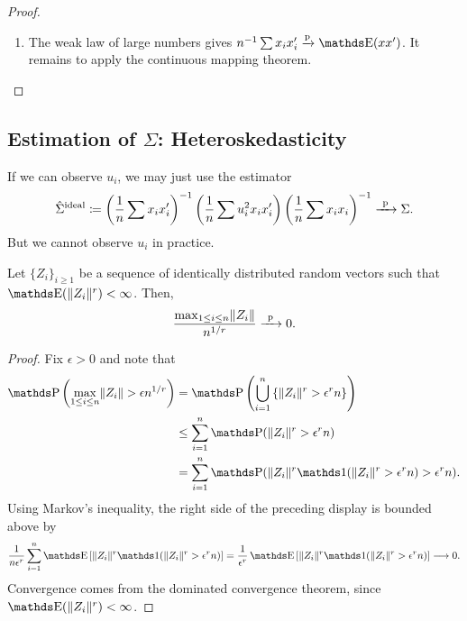 \documentclass[letterpaper, 10pt]{article}
\begin{document}
\begin{proof}
\begin{enumerate}[label=(\roman*)]
  \item %
    The weak law of large numbers gives \(n^{-1} \sum x_i x_i' \probto \E(xx')\).
    It remains to apply the continuous mapping theorem.
\end{enumerate}
\end{proof}



\subsection{Estimation of \texorpdfstring{\(\Sigma\)}{the Asymptotic Covariance Matrix}: Heteroskedasticity}
If we can observe \(u_i\), we may just use the estimator
\[
  \hat{\Sigma}^{\text{ideal}}
  \coloneqq \left( \frac{1}{n} \sum x_i x_i' \right)^{-1} \left( \frac{1}{n} \sum u_i^2 x_i x_i' \right) \left( \frac{1}{n} \sum x_i x_i \right)^{-1}
  \xrightarrow{\ \mathrm{p}\ } \Sigma.
\]
But we cannot observe \(u_i\) in practice.


\begin{lemma}
  Let \(\{Z_i\}_{i \geq 1}\) be a sequence of identically distributed random vectors such that \(\E(\norm{Z_i}^r) < \infty\).
  Then,
  \[
    \frac{\max_{1 \leq i \leq n} \lVert Z_i\rVert}{n^{1 / r}}
    \xrightarrow{\ \mathrm{p}\ } 0.
  \]
\end{lemma}
\begin{proof}
  Fix \(\epsilon > 0\) and note that
  \begin{align*}
    \P\left( \max_{1 \leq i \leq n} \norm{Z_i} > \epsilon n^{1 / r} \right)
    &= \P\left( \bigcup_{i = 1}^n \left\{ \norm{Z_i}^r > \epsilon^r n \right\} \right) \\
    &\leq \sum_{i = 1}^n \P(\norm{Z_i}^r > \epsilon^r n) \\
    &= \sum_{i = 1}^n \P(\norm{Z_i}^r \ind(\norm{Z_i}^r > \epsilon^r n) > \epsilon^r n).
  \end{align*}
  Using Markov's inequality, the right side of the preceding display is bounded above by
  \[
    \frac{1}{n \epsilon^r} \sum_{i = 1}^n \E\left[ \norm{Z_i}^r \ind(\norm{Z_i}^r > \epsilon^r n) \right]
    = \frac{1}{\epsilon^r} \E\left[ \norm{Z_i}^r \ind(\norm{Z_i}^r > \epsilon^r n) \right]
    \longrightarrow 0.
  \]
  Convergence comes from the dominated convergence theorem, since \(\E(\norm{Z_i}^r) < \infty\).
\end{proof}
\end{document}
